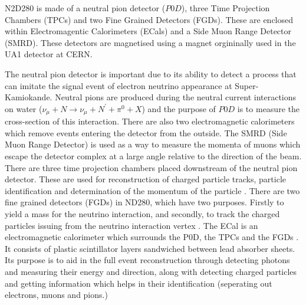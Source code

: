 N2D280 is made of a neutral pion detector ($P0D$), three Time Projection Chambers (TPCs) and two Fine Grained Detectors (FGDs). These are enclosed within Electromagentic Calorimeters (ECals) and a Side Muon Range Detector (SMRD). These detectors are magnetised using a magnet orgininally used in the UA1 detector at CERN. 

The neutral pion detector is important due to its ability to detect a process that can imitate the signal event of electron neutrino appearance at Super-Kamiokande. Neutral pions are produced during the neutral current interactions on water ($\nu_{\mu} + N \rightarrow \nu_{\mu} + N^{'} +\pi^{0} + X$) and the purpose of $P0D$ is to measure the cross-section of this interaction. 
\newline 
 There are also two electromagnetic calorimeters which remove events entering the detector from the outside. The SMRD (Side Muon Range Detector) is used as a way to measure the momenta of muons which escape the detector complex at a large angle relative to the direction of the beam. 
\newline
There are three time projection chambers placed downstream of the neutral pion detector. These are used for reconstruction of charged particle tracks, particle identification and determination of the momentum of the particle \cite{abgrall2011time}. There are two fine grained detectors (FGDs) in ND280, which have two purposes. Firstly to yield a mass for the neutrino interaction, and secondly, to track the charged particles issuing from the neutrino interaction vertex \cite{amaudruz2012t2k}.
\newline
The ECal is an electromagnetic calorimeter which surrounds the P0D, the TPCs and the FGDs \cite{allan2013electromagnetic}. It consists of plastic scintillator layers sandwiched between lead absorber sheets. Its purpose is to aid in the full event reconstruction through detecting photons and measuring their energy and direction, along with detecting charged particles and getting information which helps in their identification (seperating out electrons, muons and pions.)

